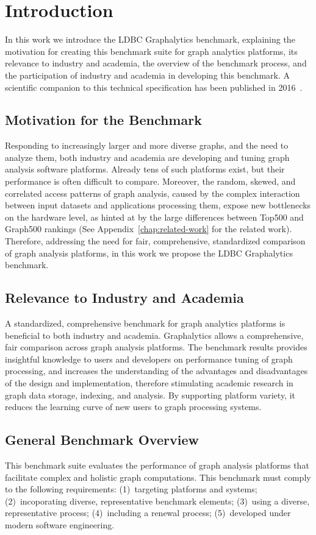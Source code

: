 \chapter{Introduction}
\label{chap:introduction}
In this work we introduce the LDBC Graphalytics benchmark, explaining the motivation for creating this benchmark suite for graph analytics platforms, its relevance to industry and academia, the overview of the benchmark process, and the participation of industry and academia in developing this benchmark. A scientific companion to this technical specification has been published in 2016~\cite{DBLP:journals/pvldb/IosupHNHPMCCSATXNB16}.

\section{Motivation for the Benchmark}
Responding to increasingly larger and more diverse graphs, and the need to analyze them, both industry and academia are developing and tuning graph analysis software platforms. Already tens of such platforms exist,	but their performance is often difficult to compare. Moreover, the random, skewed, and correlated access patterns of graph analysis, caused by the complex interaction between input datasets and applications processing them, expose new bottlenecks on the hardware level, as hinted at by the large differences between Top500 and Graph500 rankings (See Appendix~\ref{chap:related-work} for the related work). Therefore, addressing the need for fair, comprehensive, standardized comparison of graph analysis platforms, in this work we propose the LDBC Graphalytics benchmark.

\section{Relevance to Industry and Academia}
A standardized, comprehensive benchmark for graph analytics platforms is beneficial to both industry and academia. Graphalytics allows a comprehensive, fair comparison across graph analysis platforms. The benchmark results provides insightful knowledge to users and developers on performance tuning of graph processing, and increases the understanding of the advantages and disadvantages of the design and implementation, therefore stimulating academic research in graph data storage, indexing, and analysis. By supporting platform variety, it reduces the learning curve of new users to graph processing systems.

\section{General Benchmark Overview}
This benchmark suite evaluates the performance of graph analysis platforms that facilitate complex and holistic graph computations. This benchmark must comply to the following requirements: (1)~targeting platforms and systems; (2)~incoporating diverse, representative benchmark elements; (3)~using a diverse, representative process; (4)~including a renewal process; (5)~developed under modern software engineering.


